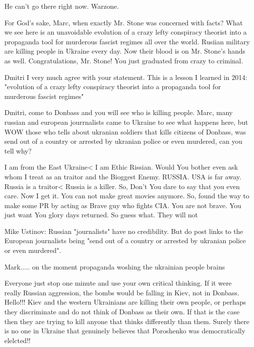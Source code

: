 \begin{itemize}
\begin{itemize}
He can't go there right now. Warzone.


For God's sake, Marc, when exactly Mr. Stone was concerned with facts? What we
see here is an unavoidable evolution of a crazy lefty conspiracy theorist into
a propaganda tool for murderous fascist regimes all over the world. Rusiian
military are killing people in Ukraine every day. Now their blood is on Mr.
Stone's hands as well. Congratulations, Mr. Stone! You just graduated from
crazy to criminal.


Dmitri I very much agree with your statement. This is a lesson I learned in
2014: "evolution of a crazy lefty conspiracy theorist into a propaganda tool for
murderous fascist regimes"


Dmitri, come to Donbass and you will see who is killing people. Marc, many
russian and european jourrnalists came to Ukraine to see what happens here, but
WOW those who tells about ukranian soldiers that kills citizens of Donbass, was
send out of a country or arrested by ukranian police or even murdered, can you
tell why?



I am from the East Ukraine< I am Ethic Rissian. Would You bother even ask whom
I treat as an traitor and the Bioggest Enemy. RUSSIA. USA is far away. Russia
is a traitor< Russia is a killer. So, Don't You dare to say that you even care.
Now I get it. You can not make great movies anymore. So, found the way to make
some PR by acting as Brave guy who fights CIA. You are not brave. You just want
You glory days returned. So guess what. They will not



Mike Ustinov: Russian "journalists" have no credibility. But do post links to
the European journalists being "send out of a country or arrested by ukranian
police or even murdered".

Mark..... on the moment propaganda woshing the ukrainian people brains


Everyone just stop one minute and use your own critical thinking. If it were
really Russian aggression, the bombs would be falling in Kiev, not in Donbass.
Hello!!! Kiev and the western Ukrainians are killing their own people, or
perhaps they discriminate and do not think of Donbass as their own. If that is
the case then they are trying to kill anyone that thinks differently than them.
Surely there is no one in Ukraine that genuinely believes that Poroshenko was
democratically elelcted!!


\end{itemize}
\end{itemize}
